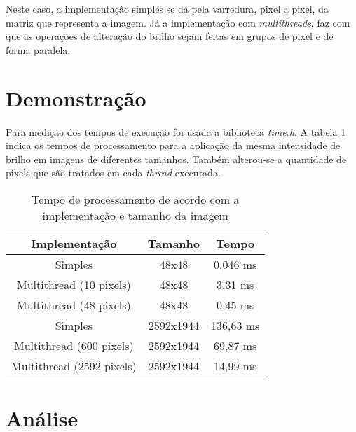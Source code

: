 \documentclass[a4paper, 10pt, conference]{ieeeconf}
\begin{document}
Neste caso, a implementação simples se dá pela varredura, pixel a pixel, da matriz que representa a imagem. Já a implementação com \textit{multithreads}, faz com que as operações de alteração do brilho sejam feitas em grupos de pixel e de forma paralela.

\section{Demonstração}


Para medição dos tempos de execução foi usada a biblioteca \textit{time.h}. A tabela \ref{tabela2} indica os tempos de processamento para a aplicação da mesma intensidade de brilho em imagens de diferentes tamanhos. Também alterou-se a quantidade de pixels que são tratados em cada \textit{thread} executada.

\begin{table}[h]
	\centering
	\caption{Tempo de processamento de acordo com a implementação e tamanho da imagem}
	\label{tabela2}
	\begin{tabular}{|c|c|c|}
		\hline
		\textbf{Implementação}        & \textbf{Tamanho}                                                                                                               & \textbf{Tempo} \\ \hline
		Simples     & {48x48}	& {0,046 ms}                                                                                    \\ \hline
		Multithread (10 pixels)        & {48x48}	& {3,31 ms} \\ \hline
		Multithread (48 pixels)        & {48x48}	& {0,45 ms} \\ \hline
		Simples     & {2592x1944}	& {136,63 ms}                                                                                    \\ \hline
		Multithread (600 pixels)        & {2592x1944}	& {69,87 ms} \\ \hline
		Multithread (2592 pixels)        & {2592x1944}	& {14,99 ms} \\ \hline
		
	\end{tabular}
\end{table}

\section{Análise}
\end{document}
